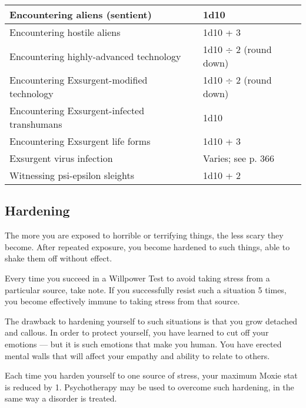 \begin{table}
\begin{tabularx}{\textwidth}{|X|l|}
Encountering aliens (sentient)	&1d10	\\ \hline

Encountering hostile aliens	&1d10 + 3	\\ \hline

Encountering highly-advanced technology	&1d10 $\div$ 2 (round down)	\\ \hline

Encountering Exsurgent-modified technology	&1d10 $\div$ 2 (round down)	\\ \hline

Encountering Exsurgent-infected transhumans	&1d10	\\ \hline

Encountering Exsurgent life forms	&1d10 + 3	\\ \hline

Exsurgent virus infection	&Varies; see p. 366	\\ \hline

Witnessing psi-epsilon sleights	&1d10 + 2	\\ \hline

\end{tabularx} \label{tab:stressful-experiences} \end{table} 



\subsection{Hardening} \label{sec:hardening} 

The more you are exposed to horrible or terrifying things, the less scary they become. After repeated exposure, you become hardened to such things, able to shake them off without effect. 

Every time you succeed in a Willpower Test to avoid taking stress from a particular source, take note. If you successfully resist such a situation 5 times, you become effectively immune to taking stress from that source. 

The drawback to hardening yourself to such situations is that you grow detached and callous. In order to protect yourself, you have learned to cut off your emotions --- but it is such emotions that make you human. You have erected mental walls that will affect your empathy and ability to relate to others. 

Each time you harden yourself to one source of stress, your maximum Moxie stat is reduced by 1. Psychotherapy may be used to overcome such hardening, in the same way a disorder is treated. 



